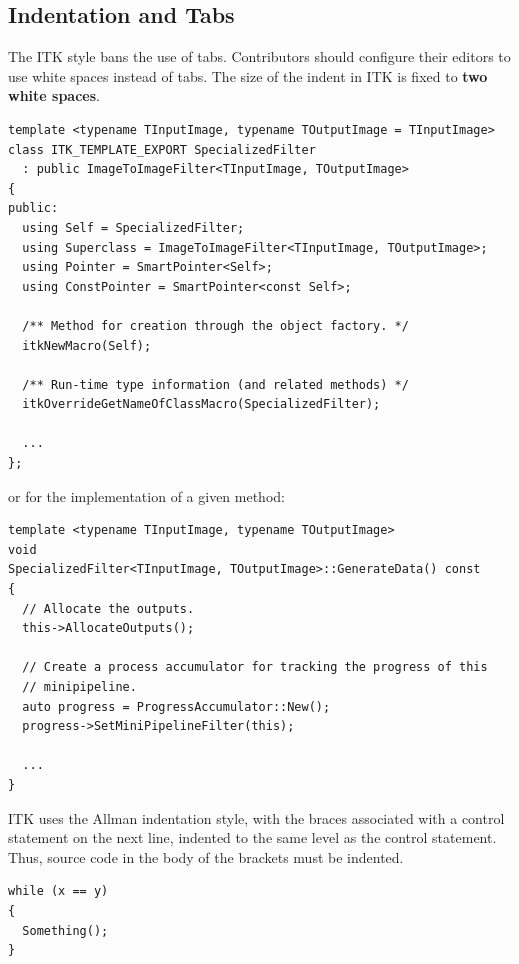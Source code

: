 \subsection{Indentation and Tabs}%
\label{subsec:IndentationAndTabs}

The ITK style bans the use of tabs. Contributors should configure their editors
to use white spaces instead of tabs. The size of the indent in ITK is fixed to
\textbf{two white spaces}.

\small
\begin{verbatim}
template <typename TInputImage, typename TOutputImage = TInputImage>
class ITK_TEMPLATE_EXPORT SpecializedFilter
  : public ImageToImageFilter<TInputImage, TOutputImage>
{
public:
  using Self = SpecializedFilter;
  using Superclass = ImageToImageFilter<TInputImage, TOutputImage>;
  using Pointer = SmartPointer<Self>;
  using ConstPointer = SmartPointer<const Self>;

  /** Method for creation through the object factory. */
  itkNewMacro(Self);

  /** Run-time type information (and related methods) */
  itkOverrideGetNameOfClassMacro(SpecializedFilter);

  ...
};
\end{verbatim}
\normalsize

or for the implementation of a given method:

\small
\begin{verbatim}
template <typename TInputImage, typename TOutputImage>
void
SpecializedFilter<TInputImage, TOutputImage>::GenerateData() const
{
  // Allocate the outputs.
  this->AllocateOutputs();

  // Create a process accumulator for tracking the progress of this
  // minipipeline.
  auto progress = ProgressAccumulator::New();
  progress->SetMiniPipelineFilter(this);

  ...
}
\end{verbatim}
\normalsize

ITK uses the Allman indentation style, with the braces associated with a
control statement on the next line, indented to the same level as the control
statement. Thus, source code in the body of the brackets must be indented.

\small
\begin{verbatim}
while (x == y)
{
  Something();
}
\end{verbatim}
\normalsize


